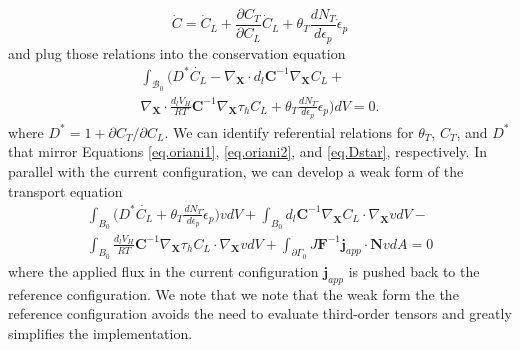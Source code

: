 \documentclass[10pt]{elsarticle}
\newcommand{\mbs}[1]{\boldsymbol{#1}}
\def\bs{{\mbs{s}}} \def\bt{{\mbs{t}}} \def\bu{{\mbs{u}}}
\def\bs{\boldsymbol}
\begin{document}
%
\begin{equation}
\label{eq.cdotref}{\dot{C} = \dot{C}_{L} + \frac{\partial C_{T}}{\partial C_{L}} \dot{C}_{L} +\theta_{T} \frac{d N_{T}}{d \epsilon_{p}} \dot{\epsilon}_{p}} 
\end{equation}
and plug those relations into the conservation equation
%
\begin{align}
\label{eq.hconservationref4} \int_{\mathcal{B}_{0}} \bigg( D^{*}\dot{C_{L}} -   \nabla_{\bs{X}}  \cdot d_{l} \bs{C}^{-1}  \nabla_{\bs{X}} C_{L}  +   \nonumber \\ \nabla_{\bs{X}}  \cdot \frac{d_{l} V_{H}}{RT} \bs{C}^{-1} \nabla_{\bs{X}} \tau_{h} C_{L} + \theta_{T} \frac{d N_{T}}{d \epsilon_{p}} \dot{\epsilon}_{p} \bigg) dV = 0.
\end{align}
where $D^{*} = 1 + \partial C_{T}/ \partial C_{L}$. We can identify referential relations for $\theta_{T}$, $C_{T}$, and $D^{*}$  that mirror Equations \ref{eq.oriani1}, \ref{eq.oriani2}, and \ref{eq.Dstar}, respectively. In parallel with the current configuration, we can develop a weak form of the transport equation
%
\begin{align}
\label{eq.hconservationref5} \int_{B_{0}} \bigg( D^{*}\dot{C_{L}} +  \theta_{T} \frac{d N_{T}}{d \epsilon_{p}} \dot{\epsilon}_{p} \bigg)vdV  + \int_{B_{0}}  d_{l} \bs{C}^{-1}  \nabla_{\bs{X}} C_{L}  \cdot  \nabla_{\bs{X}}v dV - \nonumber \\ \int_{B_{0}}  \frac{d_{l} V_{H}}{RT} \bs{C}^{-1} \nabla_{\bs{X}} \tau_{h}C_{L}  \cdot \nabla_{\bs{X}}v dV + \int_{\partial \Gamma_{0}} J\bs{F}^{-1}\bs{j}_{app} \cdot \bs{N}vdA = 0
\end{align}
%
where the applied flux in the current configuration $\bs{j}_{app}$ is pushed back to the reference configuration. We note that we note that the weak form the the reference configuration avoids the need to evaluate third-order tensors and greatly simplifies the implementation. 
%
%
%
%
%
%
\end{document}

